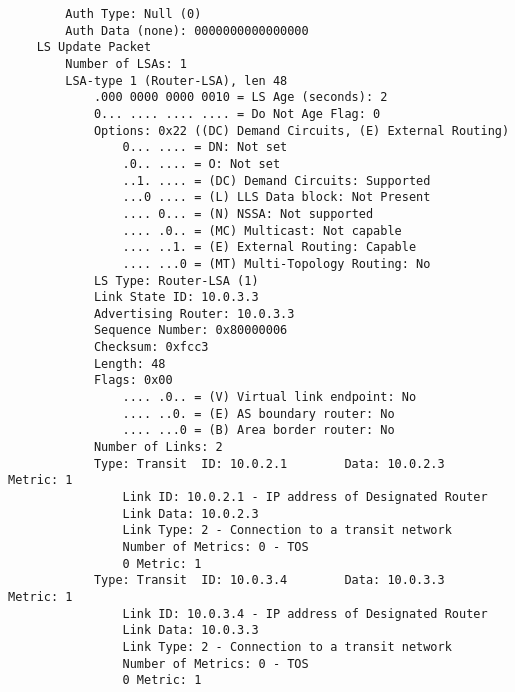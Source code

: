 \begin{lstlisting}
        Auth Type: Null (0)
        Auth Data (none): 0000000000000000
    LS Update Packet
        Number of LSAs: 1
        LSA-type 1 (Router-LSA), len 48
            .000 0000 0000 0010 = LS Age (seconds): 2
            0... .... .... .... = Do Not Age Flag: 0
            Options: 0x22 ((DC) Demand Circuits, (E) External Routing)
                0... .... = DN: Not set
                .0.. .... = O: Not set
                ..1. .... = (DC) Demand Circuits: Supported
                ...0 .... = (L) LLS Data block: Not Present
                .... 0... = (N) NSSA: Not supported
                .... .0.. = (MC) Multicast: Not capable
                .... ..1. = (E) External Routing: Capable
                .... ...0 = (MT) Multi-Topology Routing: No
            LS Type: Router-LSA (1)
            Link State ID: 10.0.3.3
            Advertising Router: 10.0.3.3
            Sequence Number: 0x80000006
            Checksum: 0xfcc3
            Length: 48
            Flags: 0x00
                .... .0.. = (V) Virtual link endpoint: No
                .... ..0. = (E) AS boundary router: No
                .... ...0 = (B) Area border router: No
            Number of Links: 2
            Type: Transit  ID: 10.0.2.1        Data: 10.0.2.3        Metric: 1
                Link ID: 10.0.2.1 - IP address of Designated Router
                Link Data: 10.0.2.3
                Link Type: 2 - Connection to a transit network
                Number of Metrics: 0 - TOS
                0 Metric: 1
            Type: Transit  ID: 10.0.3.4        Data: 10.0.3.3        Metric: 1
                Link ID: 10.0.3.4 - IP address of Designated Router
                Link Data: 10.0.3.3
                Link Type: 2 - Connection to a transit network
                Number of Metrics: 0 - TOS
                0 Metric: 1
\end{lstlisting}

